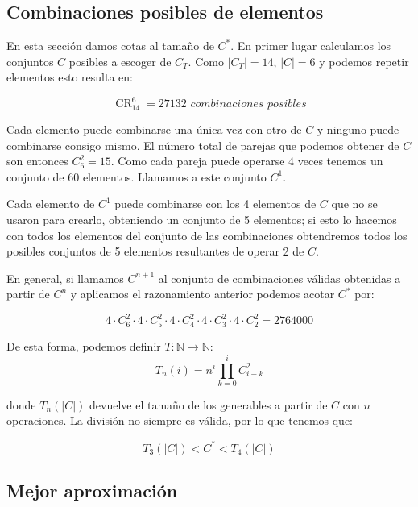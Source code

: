 \subsection{Combinaciones posibles de elementos}

En esta sección damos cotas al tamaño de $C^{\ast}$. En primer lugar calculamos
los conjuntos $C$ posibles a escoger de $C_T$. Como $|C_T| = 14$, $|C| = 6$ y
podemos repetir elementos esto resulta en:

\[\operatorname{CR}_{14}^{6} = 27132 \textit{ combinaciones posibles}\]

Cada elemento puede combinarse una única vez con otro de $C$
y ninguno puede combinarse consigo mismo. El número total de parejas que podemos
obtener de $C$ son entonces $C_{6}^{2}=15$.
Como cada pareja puede operarse 4 veces tenemos un conjunto de 60 elementos.
Llamamos a este conjunto $C^1$.

Cada elemento de $C^1$ puede combinarse con los 4 elementos de $C$ que no se
usaron para crearlo, obteniendo un conjunto de 5 elementos;
si esto lo hacemos con todos los elementos del conjunto de las combinaciones
obtendremos todos los posibles conjuntos de 5 elementos resultantes de operar
2 de $C$.

En general, si llamamos $C^{n+1}$ al conjunto de combinaciones válidas obtenidas
a partir de $C^n$ y aplicamos el razonamiento anterior podemos acotar $C^{\ast}$
por:

\[ 4 \cdot C_6^2 \cdot 4 \cdot C_5^2 \cdot 4 \cdot C_4^2 \cdot 4 \cdot C_3^2 \cdot 4 \cdot C_2^2= 2764000\]

De esta forma, podemos definir $T:\mathbb{N} \to \mathbb{N}$:
\[T_n(i)=n^i\prod_{k=0}^{i}C_{i-k}^{2}\]

donde $T_n(|C|)$ devuelve el tamaño de los generables a partir de $C$ con $n$
operaciones. La división no siempre es válida, por lo que tenemos que:

\[T_3(|C|) < C^{\ast} < T_4(|C|)\]

\subsection{Mejor aproximación}
